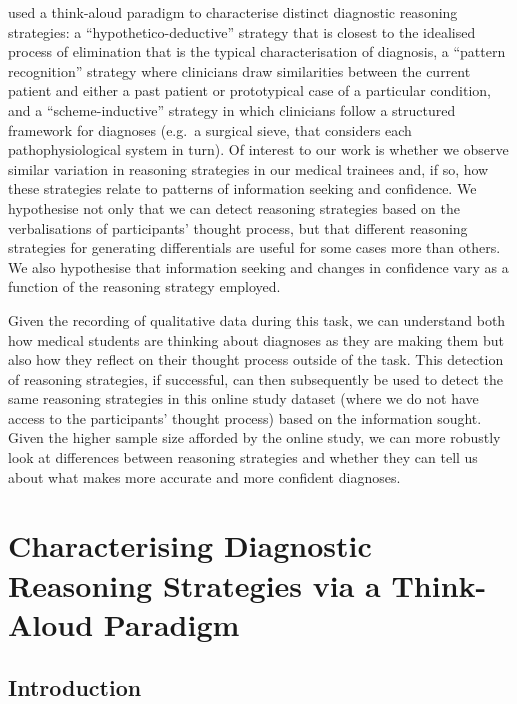 \documentclass[a4paper, nobind]{templates/ociamthesis}
\begin{document}
\hfill\break
\textcite{coderre_diagnostic_2003} used a think-aloud paradigm to characterise distinct diagnostic reasoning strategies: a ``hypothetico-deductive'' strategy that is closest to the idealised process of elimination that is the typical characterisation of diagnosis, a ``pattern recognition'' strategy where clinicians draw similarities between the current patient and either a past patient or prototypical case of a particular condition, and a ``scheme-inductive'' strategy in which clinicians follow a structured framework for diagnoses (e.g.~a surgical sieve, that considers each pathophysiological system in turn). Of interest to our work is whether we observe similar variation in reasoning strategies in our medical trainees and, if so, how these strategies relate to patterns of information seeking and confidence. We hypothesise not only that we can detect reasoning strategies based on the verbalisations of participants' thought process, but that different reasoning strategies for generating differentials are useful for some cases more than others. We also hypothesise that information seeking and changes in confidence vary as a function of the reasoning strategy employed.

\hfill\break
Given the recording of qualitative data during this task, we can understand both how medical students are thinking about diagnoses as they are making them but also how they reflect on their thought process outside of the task. This detection of reasoning strategies, if successful, can then subsequently be used to detect the same reasoning strategies in this online study dataset (where we do not have access to the participants' thought process) based on the information sought. Given the higher sample size afforded by the online study, we can more robustly look at differences between reasoning strategies and whether they can tell us about what makes more accurate and more confident diagnoses.

\chapter{Characterising Diagnostic Reasoning Strategies via a Think-Aloud Paradigm}\label{chapter-4}

\adjustmtc
{}

\section{Introduction}\label{introduction-2}
\end{document}

